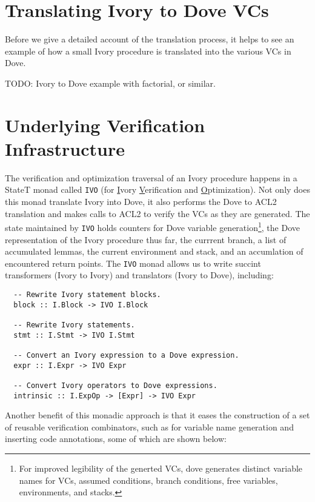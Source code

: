 \documentclass{article}
\begin{document}
\section{Translating Ivory to Dove VCs}

Before we give a detailed account of the translation process, it helps to see an 
example of how a small Ivory procedure is translated into the various VCs in Dove.

TODO: Ivory to Dove example with factorial, or similar.


\section{Underlying Verification Infrastructure}

The verification and optimization traversal
of an Ivory procedure happens in a StateT monad called \texttt{IVO}
(for \underline{I}vory \underline{V}erification and \underline{O}ptimization).
Not only does this monad translate Ivory into Dove, it also performs the Dove to ACL2
translation and makes calls to ACL2 to verify the VCs as they are generated.
The state maintained by \texttt{IVO} holds
counters for Dove variable generation\footnote{For improved legibility of the generted VCs,
dove generates distinct variable names
for VCs, assumed conditions, branch conditions, free variables,
environments, and stacks.},
the Dove representation of the Ivory procedure thus far,
the currrent branch,
a list of accumulated lemmas,
the current environment and stack, and an accumlation
of encountered return points.
The \texttt{IVO} monad allows us to write
succint transformers (Ivory to Ivory) and translators (Ivory to Dove),
including:

\begin{lstlisting}
  -- Rewrite Ivory statement blocks.
  block :: I.Block -> IVO I.Block
  
  -- Rewrite Ivory statements.
  stmt :: I.Stmt -> IVO I.Stmt
  
  -- Convert an Ivory expression to a Dove expression.
  expr :: I.Expr -> IVO Expr
  
  -- Convert Ivory operators to Dove expressions.
  intrinsic :: I.ExpOp -> [Expr] -> IVO Expr
\end{lstlisting}

Another benefit of this monadic approach is that it
eases the construction of a set of reusable verification combinators,
such as for variable name generation and inserting code annotations, 
some of which are shown below:
\end{document}
